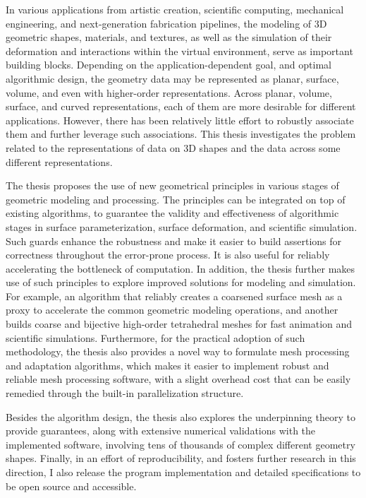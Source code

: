 In various applications from artistic creation, scientific computing, mechanical engineering, and next-generation fabrication pipelines, 
the modeling of 3D geometric shapes, materials, and textures, as well as the simulation of their deformation and interactions within the virtual environment, serve as important building blocks.
Depending on the application-dependent goal, and optimal algorithmic design, the geometry data may be represented as planar, surface, volume, and even with higher-order representations.
Across planar, volume, surface, and curved representations, each of them are more desirable for different applications. However, there has been relatively little effort to robustly associate them and further leverage such associations.
This thesis investigates the problem related to the representations of data on 3D shapes and the data across some different representations. 

The thesis proposes the use of new geometrical principles in various stages of geometric modeling and processing. The principles can be integrated on top of existing algorithms, to guarantee the validity and effectiveness of algorithmic stages in surface parameterization, surface deformation, and scientific simulation.
Such guards enhance the robustness and make it easier to build assertions for correctness throughout the error-prone process. It is also useful for reliably accelerating the bottleneck of computation. 
In addition, the thesis further makes use of such principles to explore improved solutions for modeling and simulation. 
For example, an algorithm that reliably creates a coarsened surface mesh as a proxy to accelerate the common geometric modeling operations, and another builds coarse and bijective high-order tetrahedral meshes for fast animation and scientific simulations.
Furthermore, for the practical adoption of such methodology, the thesis also provides a novel way to formulate mesh processing and adaptation algorithms, which makes it easier to implement robust and reliable mesh processing software, with a slight overhead cost that can be easily remedied through the built-in parallelization structure.

Besides the algorithm design, the thesis also explores the underpinning theory to provide guarantees, along with extensive numerical validations with the implemented software, involving tens of thousands of complex different geometry shapes. Finally, in an effort of reproducibility, and fosters further research in this direction, I also release the program implementation and detailed specifications to be open source and accessible.
